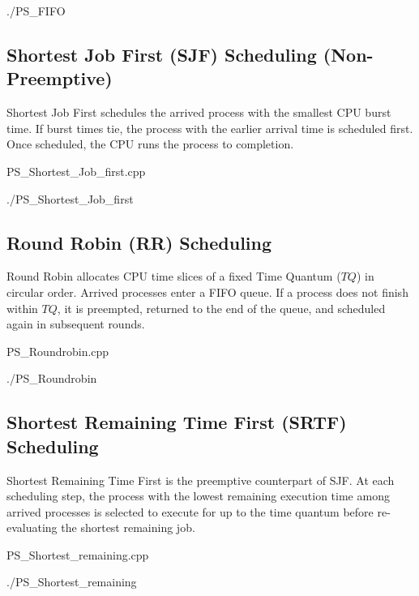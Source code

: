 \documentclass[11pt,a4paper]{article}
\begin{document}
\vspace{0.8em}
\begin{termbox}{./PS\_FIFO}

\end{termbox}

\newpage

\subsection{Shortest Job First (SJF) Scheduling (Non-Preemptive)}
Shortest Job First schedules the arrived process with the smallest CPU burst time. If burst times tie, the process with the earlier arrival time is scheduled first. Once scheduled, the CPU runs the process to completion.

\begin{codebox}{PS\_Shortest\_Job\_first.cpp}

\end{codebox}

\vspace{0.8em}
\begin{termbox}{./PS\_Shortest\_Job\_first}

\end{termbox}

\newpage

\subsection{Round Robin (RR) Scheduling}
Round Robin allocates CPU time slices of a fixed Time Quantum ($TQ$) in circular order. Arrived processes enter a FIFO queue. If a process does not finish within $TQ$, it is preempted, returned to the end of the queue, and scheduled again in subsequent rounds.

\begin{codebox}{PS\_Roundrobin.cpp}

\end{codebox}

\vspace{0.8em}
\begin{termbox}{./PS\_Roundrobin}

\end{termbox}

\newpage

\subsection{Shortest Remaining Time First (SRTF) Scheduling}
Shortest Remaining Time First is the preemptive counterpart of SJF. At each scheduling step, the process with the lowest remaining execution time among arrived processes is selected to execute for up to the time quantum before re-evaluating the shortest remaining job.

\begin{codebox}{PS\_Shortest\_remaining.cpp}

\end{codebox}

\vspace{0.8em}
\begin{termbox}{./PS\_Shortest\_remaining}

\end{termbox}
\end{document}
